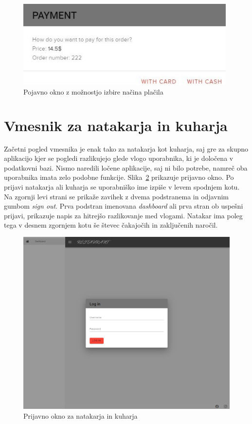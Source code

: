 \documentclass[a4paper, 12pt]{book}
\begin{document}
\begin{figure}[!htb]
\centering
\includegraphics[width=11cm]{gost_7.jpg}
\caption{Pojavno okno z možnostjo izbire načina plačila}
\label{Gost_7}
\end{figure}

\clearpage
\section{Vmesnik za natakarja in kuharja}
Začetni pogled vmesnika je enak tako za natakarja kot kuharja, saj gre za skupno aplikacijo kjer se pogledi razlikujejo glede vlogo uporabnika, ki je določena v podatkovni bazi. Nismo naredili ločene aplikacije, saj ni bilo potrebe, namreč oba uporabnika imata zelo podobne funkcije. Slika~\ref{NatKuh_zac} prikazuje prijavno okno. Po prijavi natakarja ali kuharja se uporabniško ime izpiše v levem spodnjem kotu. Na zgornji levi strani se prikaže zavihek z dvema podstranema in odjavnim gumbom \textit{sign out}. Prva podstran imenovana \textit{dashboard} ali prva stran ob uspešni prijavi, prikazuje napis za hitrejšo razlikovanje med vlogami. Natakar ima poleg tega v desnem zgornjem kotu še števec čakajočih in zaključenih naročil.
\begin{figure}[!htb]
\centering
\includegraphics[width=13.7cm]{prijavno.jpg}
\caption{Prijavno okno za natakarja in kuharja}
\label{NatKuh_zac}
\end{figure}
\end{document}
